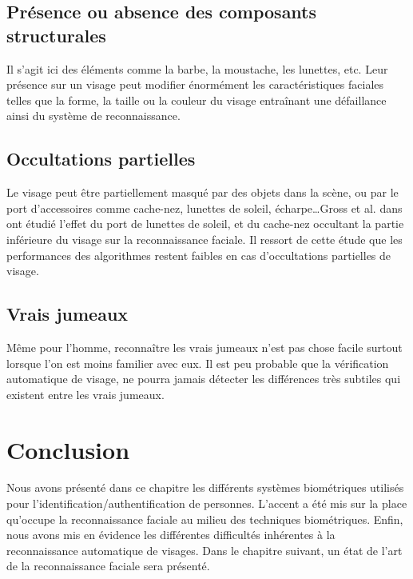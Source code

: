 \subsection{Présence ou absence des composants structurales}
Il s'agit ici des éléments comme la barbe, la moustache, les lunettes, etc. Leur présence sur un visage peut modifier énormément les caractéristiques faciales telles que la forme, la taille ou la couleur du visage entraînant une défaillance ainsi du système de reconnaissance. 

\subsection{Occultations partielles}

Le visage peut être partiellement masqué par des objets dans la scène, ou par le port d'accessoires comme cache-nez, lunettes de soleil, écharpe\ldots Gross et al. dans \cite{Gro} ont étudié l'effet du port de lunettes 
de soleil, et du cache-nez occultant la partie inférieure du visage sur la reconnaissance faciale. Il ressort de cette étude que les performances des algorithmes restent faibles en cas d'occultations partielles de visage.

\subsection{Vrais jumeaux}
Même pour l'homme, reconnaître les vrais jumeaux n'est pas chose facile surtout lorsque l'on est moins familier avec eux. Il est peu probable que la vérification automatique de visage, ne pourra jamais détecter les 
différences très subtiles qui existent entre les vrais jumeaux.


\section{Conclusion}
Nous avons présenté dans ce chapitre les différents systèmes biométriques utilisés pour l'identification/authentification de personnes. L'accent a été mis sur la place qu'occupe la reconnaissance faciale au milieu des techniques biométriques.  Enfin, nous avons mis en évidence les différentes difficultés inhérentes à la reconnaissance automatique de visages. Dans le chapitre suivant, un état de l'art de la reconnaissance faciale sera présenté.
\hspace*{10pt}

\nocite{}